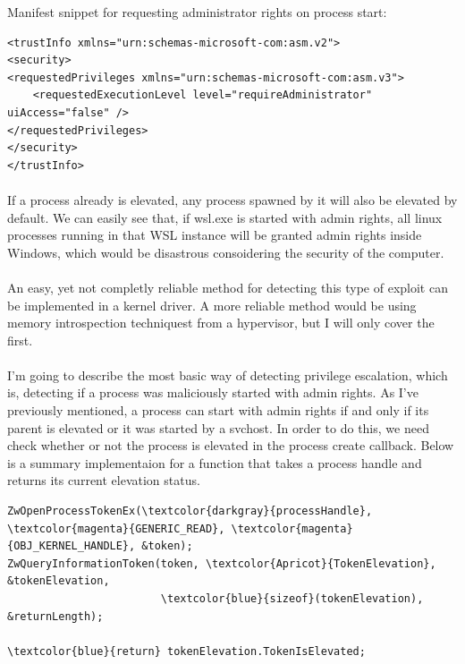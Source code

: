         Manifest snippet for requesting administrator rights on process start:
        \begin{verbatim}
<trustInfo xmlns="urn:schemas-microsoft-com:asm.v2">
<security>
<requestedPrivileges xmlns="urn:schemas-microsoft-com:asm.v3">
    <requestedExecutionLevel level="requireAdministrator" uiAccess="false" />
</requestedPrivileges>
</security>
</trustInfo>
        \end{verbatim}

        \paragraph{}
        If a process already is elevated, any process spawned by it will also be elevated by default. We can easily see that, if wsl.exe is started with admin rights, all linux
        processes running in that WSL instance will be granted admin rights inside Windows, which would be disastrous consoidering the security
        of the computer.

        \paragraph{}
        An easy, yet not completly reliable method for detecting this type of exploit can be implemented in a kernel driver. A more reliable method
        would be using memory introspection techniquest from a hypervisor, but I will only cover the first.

        \paragraph{}
        I'm going to describe the most basic way of detecting privilege escalation, which is, detecting if a process was maliciously started
        with admin rights. As I've previously mentioned, a process can start with admin rights if and only if its parent is elevated or it was started
        by a svchost. In order to do this, we need check whether or not the process is elevated in the process create callback. Below is a summary
        implementaion for a function that takes a process handle and returns its current elevation status.

        \begin{Verbatim}[fontsize=\small, commandchars=\\\{\}]
ZwOpenProcessTokenEx(\textcolor{darkgray}{processHandle}, \textcolor{magenta}{GENERIC_READ}, \textcolor{magenta}{OBJ_KERNEL_HANDLE}, &token);
ZwQueryInformationToken(token, \textcolor{Apricot}{TokenElevation}, &tokenElevation,
                        \textcolor{blue}{sizeof}(tokenElevation), &returnLength);
                        
\textcolor{blue}{return} tokenElevation.TokenIsElevated;
        \end{Verbatim}

